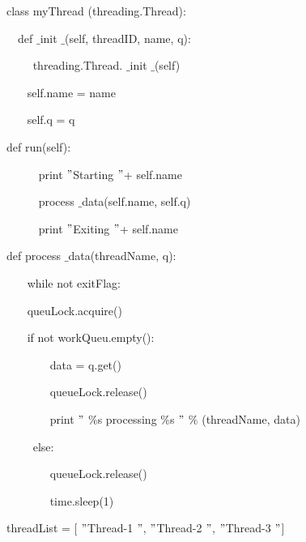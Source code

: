 \documentclass [12pt,a4paper,notitlepage,oneside,bahasa]{article}
\begin{document}
\noindent 
{\fontsize{10pt}{10pt}\selectfont class myThread (threading.Thread):} \par
\noindent 
{\fontsize{10pt}{10pt}\selectfont ~~def   $  \_  $init $  \_  $(self, threadID, name, q):} \par
\noindent 
{\fontsize{10pt}{10pt}\selectfont ~~~~ threading.Thread. $  \_  $init $  \_  $(self)} \par
\noindent 
{\fontsize{10pt}{10pt}\selectfont ~~~ self.name = name} \par
\noindent 
{\fontsize{10pt}{10pt}\selectfont ~~~ self.q = q} \par
\noindent 
{\fontsize{10pt}{10pt}\selectfont  def run(self):} \par
\noindent 
{\fontsize{10pt}{10pt}\selectfont ~~~~~ print  $ " $Starting  $ " $+ self.name} \par
\noindent 
{\fontsize{10pt}{10pt}\selectfont ~~~~~ process $  \_  $data(self.name, self.q)} \par
\noindent 
{\fontsize{10pt}{10pt}\selectfont ~~~~~ print  $ " $Exiting  $ " $+ self.name} \par
\vspace{10pt}
\noindent 
{\fontsize{10pt}{10pt}\selectfont def process $  \_  $data(threadName, q):} \par
\noindent 
{\fontsize{10pt}{10pt}\selectfont ~~~ while not exitFlag:} \par
\noindent 
{\fontsize{10pt}{10pt}\selectfont ~~~ queuLock.acquire()} \par
\noindent 
{\fontsize{10pt}{10pt}\selectfont ~~~ if not workQueu.empty():} \par
\noindent 
{\fontsize{10pt}{10pt}\selectfont ~~~~~~~ data = q.get()} \par
\noindent 
{\fontsize{10pt}{10pt}\selectfont ~~~~~~~ queueLock.release()} \par
\noindent 
{\fontsize{10pt}{10pt}\selectfont ~~~~~~~ print  $ " $ $  \%  $s processing  $  \%  $s $ " $  $  \%  $ (threadName, data)} \par
\noindent 
{\fontsize{10pt}{10pt}\selectfont ~~~~ else:} \par
\noindent 
{\fontsize{10pt}{10pt}\selectfont ~~~~~~~ queueLock.release()} \par
\noindent 
{\fontsize{10pt}{10pt}\selectfont ~~~~~~~ time.sleep(1)} \par
\vspace{12pt}
\noindent 
{\fontsize{10pt}{10pt}\selectfont threadList = [ $ " $Thread-1 $ " $,  $ " $Thread-2 $ " $,  $ " $Thread-3 $ " $]} \par
\end{document}
